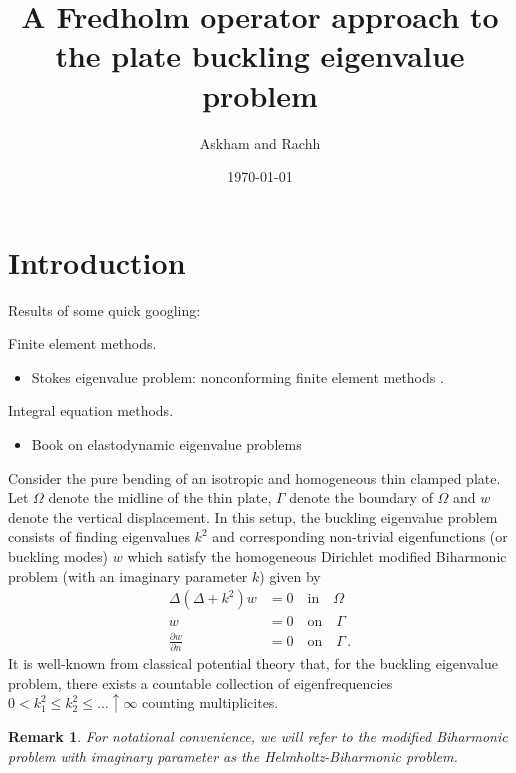 \documentclass[preprint,12pt]{article}
\title{A Fredholm operator approach to the plate
buckling eigenvalue problem}
\author{Askham and Rachh}
\date{\today}
\newcommand\dwdn{\frac{\partial w}{\partial n}}
\newtheorem{remark}{Remark}
\begin{document}
\maketitle


\section{Introduction}

Results of some quick googling:

Finite element methods.
\begin{itemize}
\item Stokes eigenvalue problem: nonconforming finite
  element methods \cite{jia2009approximation}.
\end{itemize}

Integral equation methods.
\begin{itemize}
\item Book on elastodynamic eigenvalue problems
  \cite{kitahara2014boundary}
\end{itemize}

Consider the pure bending of an isotropic and homogeneous thin clamped
plate. 
Let $\Omega$ denote the midline of the thin plate, $\Gamma$ denote the 
boundary of $\Omega$ and $w$ denote the vertical displacement.
In this setup, the buckling eigenvalue problem consists of finding 
eigenvalues $k^{2}$ and corresponding non-trivial eigenfunctions
(or buckling modes) $w$ which satisfy the homogeneous Dirichlet
modified Biharmonic problem (with an imaginary parameter $k$) given by
\begin{align}
\Delta (\Delta + k^2) w &= 0 \quad \text{in} \quad \Omega \label{eq:buck1} \\
w &= 0 \quad \text{on} \quad \Gamma \label{eq:buck2}\\
\dwdn &=0 \quad \text{on} \quad \Gamma \label{eq:buck3} \,.
\end{align}
It is well-known from classical potential theory that, 
for the buckling eigenvalue problem, there
exists a countable collection of eigenfrequencies 
$0 < k_{1}^{2} \leq k_{2}^2 \leq \ldots \uparrow \infty$
counting multiplicites.
\begin{remark}
For notational convenience,  
we will refer to the modified Biharmonic problem
with imaginary parameter as the Helmholtz-Biharmonic problem.
\end{remark}
\end{document}
